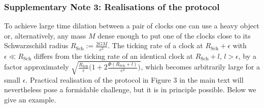 \documentclass[a4paper,11pt]{article}
\begin{document}
\subsubsection*{Supplementary Note 3: Realisations of the protocol}

To achieve large time dilation between a pair of clocks one can use a heavy object or, alternatively, any mass $M$ dense enough to put one of the clocks close to its Schwarzschild radius $R_\mathrm{Sch}:=\frac{2GM}{c^2}$. %
The ticking rate of a clock at $R_\mathrm{Sch}+\epsilon$ with $\epsilon\ll R_\mathrm{Sch}$ differs from the ticking rate of an identical clock at $R_\mathrm{Sch}+l$, $l>\epsilon$, by a factor approximately $%
\sqrt{\frac{R_\mathrm{Sch}}{\epsilon}\big(1+2\frac{\Phi(R_\mathrm{Sch}+l)}{c^2}\big)}$, which becomes arbitrarily large for a small $\epsilon$. %
{Practical} realisation of the protocol in Figure 3 %
in the main text will nevertheless pose a formidable challenge, but it is in principle possible. Below we give an example. %
\end{document}
